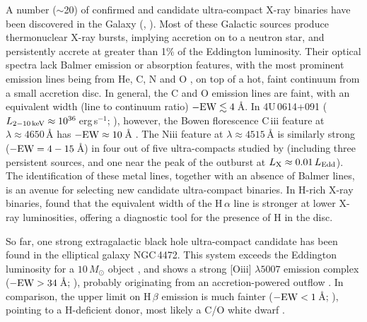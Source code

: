 \documentclass[a4paper,fleqn,usenatbib]{mnras}
\begin{document}
A number ($\sim$20) of confirmed and candidate ultra-compact X-ray binaries have been discovered in the Galaxy
(\citealp{2007A&A...465..953I}, \citealp{2010NewAR..54...87N}). Most of these Galactic sources produce thermonuclear X-ray bursts, implying accretion on to a neutron star, and persistently accrete at greater than 1\% of the Eddington luminosity. Their optical spectra lack Balmer emission or absorption features, with the most prominent emission lines being from He, C, N and O \citep{2004MNRAS.348L...7N, 2006MNRAS.370..255N, 2006A&A...450..725W}, on top of a hot, faint continuum from a small accretion disc. In general, the C and O emission lines are faint, with an equivalent width (line to continuum ratio) $\rm -EW \lesssim 4$\,{\AA}. In 4U\,0614+091 ($L_{\rm 2-10\,keV} \approx 10^{36}$\,erg\,s$^{-1}$; \citealp{2010ApJ...710..117M}), however, the Bowen florescence C\,{\sc iii} feature at $\lambda \approx 4650$\,{\AA} has $\rm -EW \approx 10$\,{\AA} \mbox{\citep{2006MNRAS.370..255N}}. The N{\sc iii} feature at $\lambda \approx 4515$\,{\AA} is similarly strong ($\rm -EW = 4-15$\,{\AA}) in four out of five ultra-compacts studied by \mbox{\citet{2006MNRAS.370..255N}} (including three persistent sources, and one near the peak of the outburst at $L_{\rm X} \approx 0.01\,L_{\rm Edd}$). The identification of these metal lines, together with an absence of Balmer lines, is an avenue for selecting new candidate ultra-compact binaries. In H-rich X-ray binaries, \citet{2009MNRAS.393.1608F} found that the equivalent width of the H\,$\alpha$ line is stronger at lower X-ray luminosities, offering a diagnostic tool for the presence of H in the disc. 

So far, one strong extragalactic black hole ultra-compact candidate has been found in the elliptical galaxy NGC\,4472. This system exceeds the Eddington luminosity for a $10\,M_\odot$ object \citep{2007Natur.445..183M}, and shows a strong [O{\sc iii}] $\lambda 5007$ emission complex ($\rm -EW > 34$\,{\AA}; \citealp{2014ApJ...785..147S}), probably originating from an accretion-powered outflow \citep{2008ApJ...683L.139Z}. In comparison, the upper limit on H\,$\beta$ emission is much fainter ($\rm -EW < 1$\,{\AA}; \citealp{2014ApJ...785..147S}), pointing to a H-deficient donor, most likely a C/O white dwarf \citep{2014ApJ...785..147S}.
\end{document}
